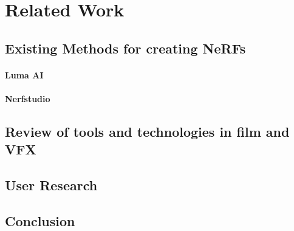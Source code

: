 %
\chapter{Related Work}
\label{sec:related}

\section{Existing Methods for creating NeRFs}
\label{sec:related:nerf}

\subsubsection{Luma AI}
\label{sec:related:nerf:luma}

\subsubsection{Nerfstudio}
\label{sec:related:nerf:nerfstudio}

\section{Review of tools and technologies in film and VFX}
\label{sec:related:vfx}


\section{User Research}
\label{sec:related:ux}


\section{Conclusion}
\label{sec:related:conclusion}

